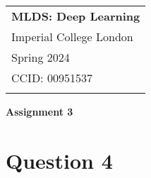 \documentclass[10pt,a4paper]{article}
\begin{document}
\thispagestyle{empty} %

\begin{tabular}{p{15.5cm}} %
{\large \bf MLDS: Deep Learning} \\
Imperial College London \\ Spring 2024  \\ CCID: 00951537\\
\hline %
\\
\end{tabular} %

\vspace*{0.3cm} %

\begin{center} %
	{\Large \bf Assignment 3} %
\end{center}  

\vspace{0.4cm}

\section*{Question 4}
\end{document}
